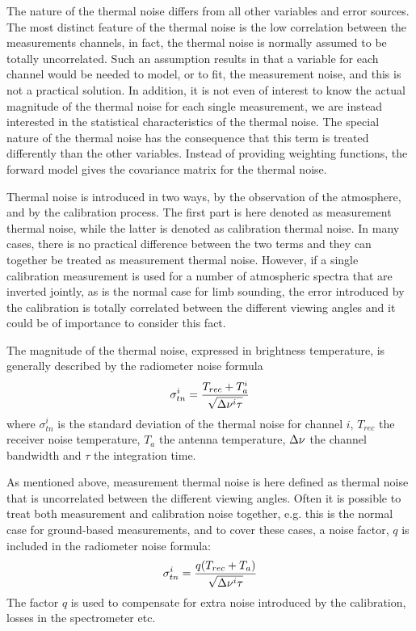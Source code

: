  \label{sec:measerr:tn}
 
 The nature of the thermal noise differs from all other variables and
 error sources. The most distinct feature of the thermal noise is the
 low correlation between the measurements channels, in fact, the
 thermal noise is normally assumed to be totally uncorrelated. Such an
 assumption results in that a variable for each channel would be
 needed to model, or to fit, the measurement noise, and this is not a
 practical solution. In addition, it is not even of interest to know
 the actual magnitude of the thermal noise for each single
 measurement, we are instead interested in the statistical
 characteristics of the thermal noise.  The special nature of the
 thermal noise has the consequence that this term is treated
 differently than the other variables. Instead of providing weighting
 functions, the forward model gives the covariance matrix for the
 thermal noise.
 
 Thermal noise is introduced in two ways, by the observation of the
 atmosphere, and by the calibration process. The first part is here
 denoted as measurement thermal noise, while the latter is denoted as
 calibration thermal noise. In many cases, there is no practical
 difference between the two terms and they can together be treated as
 measurement thermal noise. However, if a single calibration
 measurement is used for a number of atmospheric spectra that are
 inverted jointly, as is the normal case for limb sounding, the error
 introduced by the calibration is totally correlated between the
 different viewing angles and it could be of importance to consider
 this fact.
 
 The magnitude of the thermal noise, expressed in brightness
 temperature, is generally described by the radiometer noise formula
 \begin{equation}
   \sigma_{tn}^i = \frac{T_{rec}+T_a^i}{\sqrt{\Delta \nu^i \tau}}
  \label{eq:measerr:tn}
 \end{equation}
 where $\sigma_{tn}^i$ is the standard deviation of the thermal noise
 for channel $i$, $T_{rec}$ the receiver noise temperature, $T_a$ the
 antenna temperature, $\Delta \nu$ the channel bandwidth and $\tau$ the
 integration time. 
 

 \label{sec:measerr:mtn}
 
 As mentioned above, measurement thermal noise is here defined as
 thermal noise that is uncorrelated between the different viewing
 angles. Often it is possible to treat both measurement and calibration
 noise together, e.g. this is the normal case for ground-based
 measurements, and to cover these cases, a noise factor, $q$ is
 included in the radiometer noise formula:
 \begin{equation}
   \sigma_{tn}^i = \frac{q(T_{rec}+T_a)}{\sqrt{\Delta \nu^i \tau}}
  \label{eq:measerr:qtn}
 \end{equation}
 The factor $q$ is used to compensate for extra noise introduced
 by the calibration, losses in the spectrometer etc. 
 
